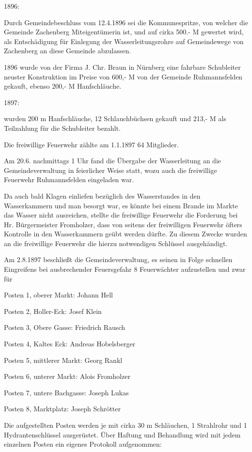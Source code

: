\documentclass{book}
\begin{document}
1896:

Durch Gemeindebeschluss vom 12.4.1896 sei die Kommunespritze, von welcher die
Gemeinde Zachenberg Miteigentümerin ist, und auf cirka 500.- M gewertet wird,
als Entschädigung für Einlegung der Wasserleitungsrohre auf Gemeindewege von
Zachenberg an diese Gemeinde abzulassen.

1896 wurde von der Firma J. Chr. Braun in Nürnberg eine fahrbare Schubleiter
neuster Konstruktion im Preise von 600,- M von der Gemeinde Ruhmannsfelden
gekauft, ebenso 200,- M Hanfschläuche.

1897:

wurden 200 m Hanfschläuche, 12 Schlauchbüchsen gekauft und 213,- M als
Teilzahlung für die Schubleiter bezahlt.

Die freiwillige Feuerwehr zählte am 1.1.1897 64 Mitglieder.

Am 20.6. nachmittags 1 Uhr fand die Übergabe der Wasserleitung an die
Gemeindeverwaltung in feierlicher Weise statt, wozu auch die freiwillige
Feuerwehr Ruhmannsfelden eingeladen war.

Da auch bald Klagen einliefen bezüglich des Wasserstandes in den Wasserkammern
und man besorgt war, es könnte bei einem Brande im Markte das Wasser nicht
ausreichen, stellte die freiwillige Feuerwehr die Forderung bei Hr.
Bürgermeister Fromholzer, dass von seitens der freiwilligen Feuerwehr öfters
Kontrolle in den Wasserkammern geübt werden dürfte. Zu diesem Zwecke wurden an
die freiwillige Feuerwehr die hierzu notwendigen Schlüssel ausgehändigt.

Am 2.8.1897 beschließt die Gemeindeverwaltung, es seinen in Folge schnellen
Eingreifens bei ausbrechender Feuersgefahr 8 Feuerwächter aufzustellen und zwar
für



Posten 1, oberer Markt: Johann Hell

Posten 2, Holler-Eck: Josef Klein

Posten 3, Obere Gasse: Friedrich Rausch

Posten 4, Kaltes Eck: Andreas Hobelsberger

Posten 5, mittlerer Markt: Georg Rankl

Posten 6, unterer Markt: Alois Fromholzer

Posten 7, untere Bachgasse: Joseph Lukas

Posten 8, Marktplatz: Joseph Schrötter



Die aufgestellten Posten werden je mit cirka 30 m Schläuchen, 1 Strahlrohr und 1
Hydrantenschlüssel ausgerüstet. Über Haftung und Behandlung wird mit jedem
einzelnen Posten ein eigenes Protokoll aufgenommen:
\end{document}
